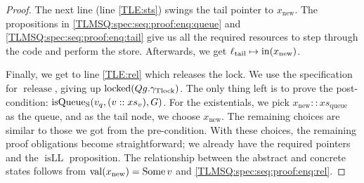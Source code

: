 \documentclass[a4paper, 10pt]{report}
\theoremstyle{definition}
\newcommand{\locked}{\operatorname{locked}}
\newcommand{\release}{\operatorname{release}}
\newcommand{\isqueueseq}{\operatorname{isQueue_{S}}}
\newcommand{\vq}{v_q}
\newcommand{\xsqueue}{xs_{\mathrm{queue}}}
\newcommand{\isLL}{\operatorname{isLL}}
\newcommand{\locN}[1]{\loc_{\mathrm{#1}}}
\newcommand{\loctail}{\locN{tail}}
\newcommand{\nIn}[1]{\operatorname{in}(#1)}
\newcommand{\nVal}[1]{\operatorname{val}(#1)}
\newcommand{\node}{x}
\newcommand{\nodeN}[1]{\node_{\mathrm{#1}}}
\newcommand{\nodenew}{\nodeN{new}}
\newcommand{\absvalue}{\val}
\newcommand{\absvalueList}{xs_v}
\newcommand{\Qg}{G}
\newcommand{\gtlock}{\gname_{\mathrm{Tlock}}}
\begin{document}
\begin{proof}
The next line (line \ref{TLE:sts}) swings the tail pointer to $\nodenew$. The propositions in \ref{TLMSQ:spec:seq:proof:enq:queue} and \ref{TLMSQ:spec:seq:proof:enq:tail} give us all the required resources to step through the code and perform the store. Afterwards, we get $\loctail \mapsto \nIn{\nodenew}$.

Finally, we get to line \ref{TLE:rel} which releases the lock. We use the specification for $\release$, giving up $\locked(Qg.\gtlock)$. The only thing left is to prove the post-condition: $\isqueueseq(\vq, (\absvalue :: \absvalueList), \Qg)$. For the existentials, we pick $\nodenew :: \xsqueue$ as the queue, and as the tail node, we choose $\nodenew$. The remaining choices are similar to those we got from the pre-condition. With these choices, the remaining proof obligations become straightforward; we already have the required pointers and the $\isLL$ proposition. The relationship between the abstract and concrete states follows from $\nVal{\nodenew} = \Some \absvalue$ and \ref{TLMSQ:spec:seq:proof:enq:rel}.
\end{proof}
\end{document}
